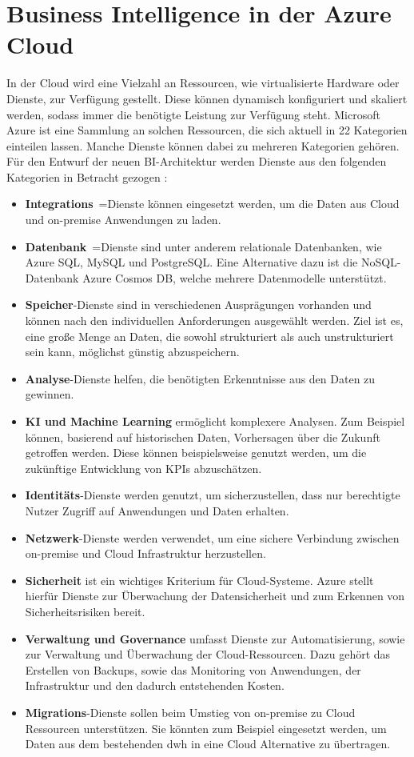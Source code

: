 \section{Business Intelligence in der Azure Cloud} \label{sec:grundlagen:bi_in_der_cloud_mit_azure}
In der Cloud wird eine Vielzahl an Ressourcen, wie virtualisierte Hardware oder Dienste, zur Verfügung gestellt. Diese können dynamisch konfiguriert und skaliert werden, sodass immer die benötigte Leistung zur Verfügung steht. Microsoft Azure ist eine Sammlung an solchen Ressourcen, die sich aktuell in 22 Kategorien einteilen lassen. Manche Dienste können dabei zu mehreren Kategorien gehören. Für den Entwurf der neuen BI-Architektur werden Dienste aus den folgenden Kategorien in Betracht gezogen \cite{chilberto_building_2020}:
\begin{itemize}
\item \textbf{Integrations}~=Dienste können eingesetzt werden, um die Daten aus Cloud und on-premise Anwendungen zu laden.
\item \textbf{Datenbank}~=Dienste sind unter anderem relationale Datenbanken, wie Azure SQL, MySQL und PostgreSQL. Eine Alternative dazu ist die NoSQL-Datenbank Azure Cosmos DB, welche mehrere Datenmodelle unterstützt.
\item \textbf{Speicher}-Dienste sind in verschiedenen Ausprägungen vorhanden und können nach den individuellen Anforderungen ausgewählt werden. Ziel ist es, eine große Menge an Daten, die sowohl strukturiert als auch unstrukturiert sein kann, möglichst günstig abzuspeichern.
\item \textbf{Analyse}-Dienste helfen, die benötigten Erkenntnisse aus den Daten zu gewinnen.
\item \textbf{KI und Machine Learning} ermöglicht komplexere Analysen. Zum Beispiel können, basierend auf historischen Daten, Vorhersagen über die Zukunft getroffen werden. Diese können beispielsweise genutzt werden, um die zukünftige Entwicklung von KPIs abzuschätzen.
\item \textbf{Identitäts}-Dienste werden genutzt, um sicherzustellen, dass nur berechtigte Nutzer Zugriff auf Anwendungen und Daten erhalten.
\item \textbf{Netzwerk}-Dienste werden verwendet, um eine sichere Verbindung zwischen on-premise und Cloud Infrastruktur herzustellen.
\item \textbf{Sicherheit} ist ein wichtiges Kriterium für Cloud-Systeme. Azure stellt hierfür Dienste zur Überwachung der Datensicherheit und zum Erkennen von Sicherheitsrisiken bereit.
\item \textbf{Verwaltung und Governance} umfasst Dienste zur Automatisierung, sowie zur Verwaltung und Überwachung der Cloud-Ressourcen. Dazu gehört das Erstellen von Backups, sowie das Monitoring von Anwendungen, der Infrastruktur und den dadurch entstehenden Kosten.
\item \textbf{Migrations}-Dienste sollen beim Umstieg von on-premise zu Cloud Ressourcen unterstützen. Sie könnten zum Beispiel eingesetzt werden, um Daten aus dem bestehenden \ac{dwh} in eine Cloud Alternative zu übertragen.
\end{itemize}
